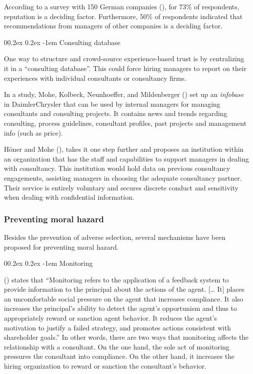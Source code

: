 \documentclass[
  man,floatsintext]{apa6}
\makeatletter
\let\oldparagraph\paragraph
\renewcommand{\paragraph}[1]{\oldparagraph{#1}\mbox{}}
\renewcommand{\paragraph}{\@startsection{paragraph}{4}{\parindent}%
  {0\baselineskip \@plus 0.2ex \@minus 0.2ex}%
  {-1em}%
  {\normalfont\normalsize\bfseries\itshape\typesectitle}}
\makeatother
\begin{document}
According to a survey with 150 German companies (), for 73\% of respondents, reputation is a deciding factor. Furthermore, 50\% of respondents indicated that recommendations from managers of other companies is a deciding factor.

\paragraph{Consulting database}\label{consulting-database}

One way to structure and crowd-source experience-based trust is by centralizing it in a ``consulting database''. This could force hiring managers to report on their experiences with individual consultants or consultancy firms.

In a study, Mohe, Kolbeck, Neunhoeffer, and Mildenberger () set up an \emph{infobase} in DaimlerChrysler that can be used by internal managers for managing consultants and consulting projects. It contains news and trends regarding consulting, process guidelines, consultant profiles, past projects and management info (such as price).

Höner and Mohe (), takes it one step further and proposes an institution within an organization that has the staff and capabilities to support managers in dealing with consultancy. This institution would hold data on previous consultancy engagements, assisting managers in choosing the adequate consultancy partner. Their service is entirely voluntary and secures discrete conduct and sensitivity when dealing with confidential information.

\subsubsection{Preventing moral hazard}\label{preventing-moral-hazard}

Besides the prevention of adverse selection, several mechanisms have been proposed for preventing moral hazard.

\paragraph{Monitoring}\label{monitoring}

() states that ``Monitoring refers to the application of a feedback system to provide information to the principal about the actions of the agent. {[}\ldots{} It{]} places an uncomfortable social pressure on the agent that increases compliance. It also increases the principal's ability to detect the agent's opportunism and thus to appropriately reward or sanction agent behavior. It reduces the agent's motivation to justify a failed strategy, and promotes actions consistent with shareholder goals.'' In other words, there are two ways that monitoring affects the relationship with a consultant. On the one hand, the sole act of monitoring pressures the consultant into compliance. On the other hand, it increases the hiring organization to reward or sanction the consultant's behavior.
\end{document}
